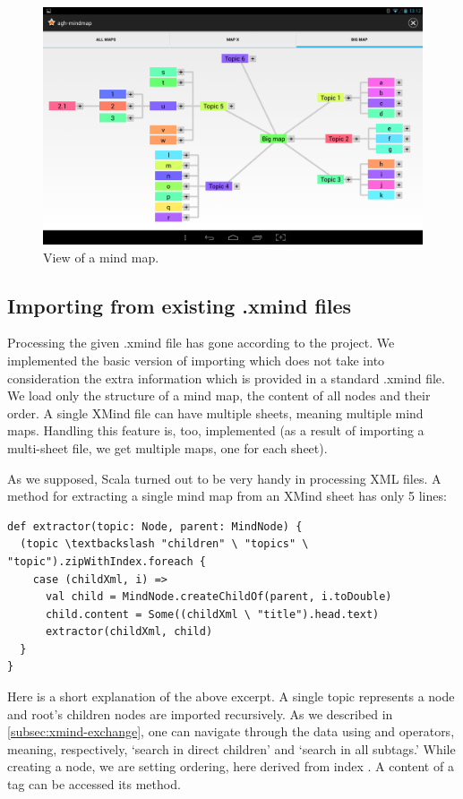 \begin{figure}[h]
	\centering
	\includegraphics[width=\textwidth]{graphics-screenshot-big-map}
	\caption{View of a mind map.}
	\label{fig:screen-map}
\end{figure}

\subsection{Importing from existing .xmind files}
\label{subsec:import}
Processing the given .xmind file has gone according to the project. We implemented the basic version of importing which does not take into consideration the extra information which is provided in a standard .xmind file. We load only the structure of a mind map, the content of all nodes and their order. A single XMind file can have multiple sheets, meaning multiple mind maps. Handling this feature is, too, implemented (as a result of importing a multi-sheet file, we get multiple maps, one for each sheet).

As we supposed, Scala turned out to be very handy in processing XML files. A method for extracting a single mind map from an XMind sheet has only 5 lines:
\begin{verbatim}
def extractor(topic: Node, parent: MindNode) {
  (topic \textbackslash "children" \ "topics" \ "topic").zipWithIndex.foreach {
    case (childXml, i) =>
      val child = MindNode.createChildOf(parent, i.toDouble)
      child.content = Some((childXml \ "title").head.text)
      extractor(childXml, child)
  }
}\end{verbatim}

Here is a short explanation of the above excerpt. A single topic represents a node and root's children nodes are imported recursively. As we described in \cref{subsec:xmind-exchange}, one can navigate through the data using \inlinecode{\textbackslash} and \inlinecode{\textbackslash\textbackslash} operators, meaning, respectively, `search in direct children' and `search in all subtags.' While creating a node, we are setting ordering, here derived from index . A content of a tag can be accessed its  method.

